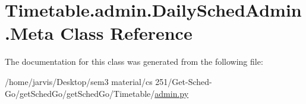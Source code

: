 \hypertarget{classTimetable_1_1admin_1_1DailySchedAdmin_1_1Meta}{}\section{Timetable.\+admin.\+Daily\+Sched\+Admin.\+Meta Class Reference}
\label{classTimetable_1_1admin_1_1DailySchedAdmin_1_1Meta}


The documentation for this class was generated from the following file\+:\begin{DoxyCompactItemize}
\item 
/home/jarvis/\+Desktop/sem3 material/cs 251/\+Get-\/\+Sched-\/\+Go/get\+Sched\+Go/get\+Sched\+Go/\+Timetable/\hyperlink{Timetable_2admin_8py}{admin.\+py}\end{DoxyCompactItemize}
